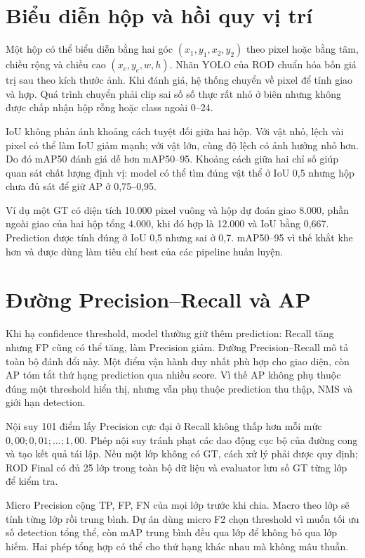 \section{Biểu diễn hộp và hồi quy vị trí}
Một hộp có thể biểu diễn bằng hai góc $(x_1,y_1,x_2,y_2)$ theo pixel hoặc bằng tâm, chiều rộng và chiều cao $(x_c,y_c,w,h)$. Nhãn YOLO của ROD chuẩn hóa bốn giá trị sau theo kích thước ảnh. Khi đánh giá, hệ thống chuyển về pixel để tính giao và hợp. Quá trình chuyển phải clip sai số số thực rất nhỏ ở biên nhưng không được chấp nhận hộp rỗng hoặc class ngoài 0--24.

IoU không phản ánh khoảng cách tuyệt đối giữa hai hộp. Với vật nhỏ, lệch vài pixel có thể làm IoU giảm mạnh; với vật lớn, cùng độ lệch có ảnh hưởng nhỏ hơn. Do đó mAP50 đánh giá dễ hơn mAP50--95. Khoảng cách giữa hai chỉ số giúp quan sát chất lượng định vị: model có thể tìm đúng vật thể ở IoU 0,5 nhưng hộp chưa đủ sát để giữ AP ở 0,75--0,95.

Ví dụ một GT có diện tích 10.000 pixel vuông và hộp dự đoán giao 8.000, phần ngoài giao của hai hộp tổng 4.000, khi đó hợp là 12.000 và IoU bằng 0,667. Prediction được tính đúng ở IoU 0,5 nhưng sai ở 0,7. mAP50--95 vì thế khắt khe hơn và được dùng làm tiêu chí best của các pipeline huấn luyện.

\section{Đường Precision--Recall và AP}
Khi hạ confidence threshold, model thường giữ thêm prediction: Recall tăng nhưng FP cũng có thể tăng, làm Precision giảm. Đường Precision--Recall mô tả toàn bộ đánh đổi này. Một điểm vận hành duy nhất phù hợp cho giao diện, còn AP tóm tắt thứ hạng prediction qua nhiều score. Vì thế AP không phụ thuộc đúng một threshold hiển thị, nhưng vẫn phụ thuộc prediction thu thập, NMS và giới hạn detection.

Nội suy 101 điểm lấy Precision cực đại ở Recall không thấp hơn mỗi mức $0,00;0,01;\ldots;1,00$. Phép nội suy tránh phạt các dao động cục bộ của đường cong và tạo kết quả tái lập. Nếu một lớp không có GT, cách xử lý phải được quy định; ROD Final có đủ 25 lớp trong toàn bộ dữ liệu và evaluator lưu số GT từng lớp để kiểm tra.

Micro Precision cộng TP, FP, FN của mọi lớp trước khi chia. Macro theo lớp sẽ tính từng lớp rồi trung bình. Dự án dùng micro F2 chọn threshold vì muốn tối ưu số detection tổng thể, còn mAP trung bình đều qua lớp để không bỏ qua lớp hiếm. Hai phép tổng hợp có thể cho thứ hạng khác nhau mà không mâu thuẫn.

